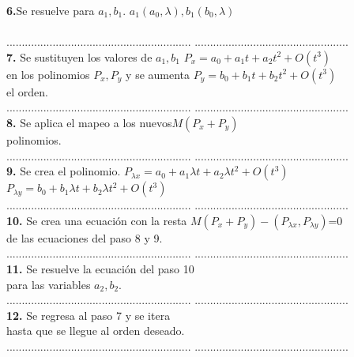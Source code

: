 \begin{center}
\begin{tabbing}
		\>\textbf{6.}Se resuelve para $a_{1},b_{1}$.\> $a_{1}(a_{0}, \lambda), b_{1}(b_{0},\lambda)$\\
		\> \> \\
		\>............................................................  \>..................................................\\
		\> \textbf{7. }Se sustituyen los valores de $a_{1},b_{1}$ \> $P_{x} = a_{0}+a_{1}t+a_{2}t^{2}+O(t^{3})$\\
		\> en los polinomios $P_{x},P_{y}$ y se aumenta\>  $P_{y} = b_{0} +b_{1}t +b_{2}t^{2}+O(t^{3})$\\
		\>  el orden.\> \\
		\>............................................................  \>..................................................\\
		\>\textbf{8.} Se aplica el mapeo a los nuevos\>$M(P_{x}+P_{y})$ \\
		\> polinomios.\>\\
		\>............................................................  \>..................................................\\
		\>\textbf{9.} Se crea el polinomio. \> $P_{\lambda x} = a_{0}+a_{1}\lambda t+a_{2}\lambda t^{2}+O(t^{3})$\\
		\> \>$P_{\lambda y} = b_{0}+b_{1}\lambda t+b_{2}\lambda t^{2}+O(t^{3})$\\
		\>............................................................  \>..................................................\\
		\>\textbf{10.} Se crea una ecuación con la resta \> $M(P_{x}+P_{y}) -(P_{\lambda x},P_{\lambda y})$=0 \\
		\> de las ecuaciones del paso 8 y 9.\> \\
		\>............................................................  \>..................................................\\
		\> \textbf{11.} Se resuelve la ecuación del paso 10 \>  \\
		\> para las variables $a_{2},b_{2}$. \>\\
		\>............................................................  \>..................................................\\
		\> \textbf{12.} Se regresa al paso 7 y se itera\> \\
		\> hasta que se llegue al orden deseado. \> \\
		\>............................................................  \>..................................................\\
		
		
		
		
	\end{tabbing} 
\end{center}


